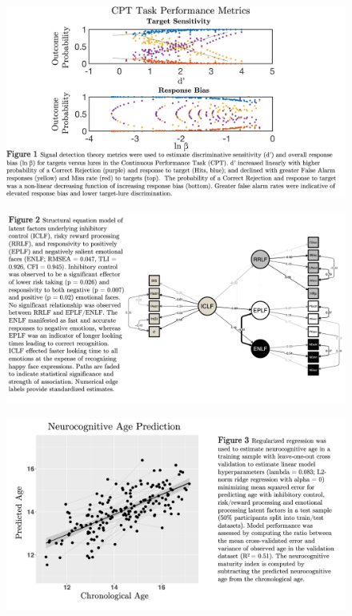\documentclass[utf8]{frontiersSCNS} %
\begin{document}
\newpage

\begin{figure}[h!]
\includegraphics[width=\textwidth,height=\textheight,keepaspectratio]{Fig-1}
\caption{}
\label{fig:1}
\end{figure}

\begin{figure}[h!]
\includegraphics[width=\textwidth,height=\textheight,keepaspectratio]{Fig-2}
\label{fig:2}
\end{figure}

\begin{figure}[h!]
\includegraphics[width=\textwidth,height=\textheight,keepaspectratio]{Fig-3}
\label{fig:3}
\end{figure}
\end{document}
